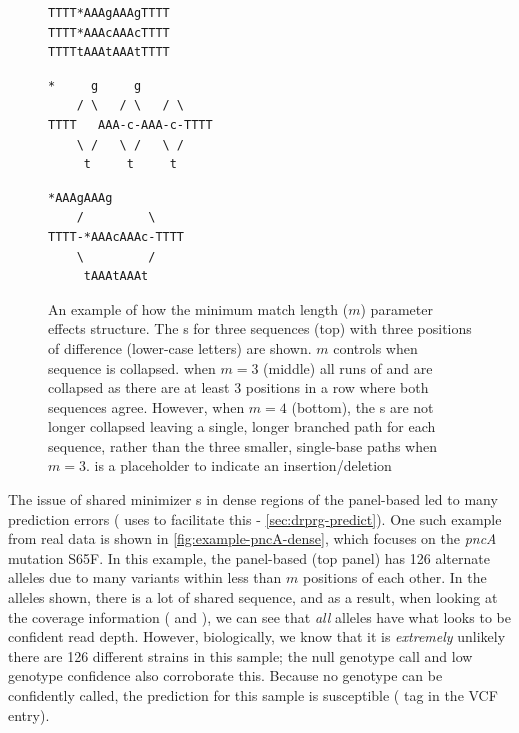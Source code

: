 \begin{figure}
\begin{Verbatim}[frame=single,framerule=0.5mm,label=Sequences,fontsize=\small,framesep=5mm]
TTTT*AAAgAAAgTTTT
TTTT*AAAcAAAcTTTT
TTTTtAAAtAAAtTTTT
\end{Verbatim}

\begin{Verbatim}[frame=single,framerule=0.5mm,label={$m=3$},fontsize=\small,framesep=5mm]
     *     g     g
    / \   / \   / \
TTTT   AAA-c-AAA-c-TTTT
    \ /   \ /   \ /
     t     t     t
\end{Verbatim}

\begin{Verbatim}[frame=single,framerule=0.5mm,label={$m=4$},fontsize=\small,framesep=5mm]
     *AAAgAAAg
    /         \
TTTT-*AAAcAAAc-TTTT
    \         /
     tAAAtAAAt
\end{Verbatim}
\caption{An example of how the \makeprg{} minimum match length ($m$) parameter effects \prg{} structure. The \prg{}s for three sequences (top) with three positions of difference (lower-case letters) are shown. $m$ controls when sequence is collapsed. when $m=3$ (middle) all runs of  and  are collapsed as there are at least 3 positions in a row where both sequences agree. However, when $m=4$ (bottom), the s are not longer collapsed leaving a single, longer branched path for each sequence, rather than the three smaller, single-base paths when $m=3$. \vrb{*} is a placeholder to indicate an insertion/deletion}
\label{fig:min-match-len-example}
\end{figure}

The issue of shared minimizer \kmer{}s in dense regions of the panel-based \prg{} led to many \drprg{} prediction errors (\drprg{} uses \pandora{} to facilitate this - \autoref{sec:drprg-predict}). One such example from real data is shown in \autoref{fig:example-pncA-dense}, which focuses on the \textit{pncA} mutation S65F. In this example, the panel-based \prg{} (top panel) has 126 alternate alleles due to many variants within less than $m$ positions of each other. In the alleles shown, there is a lot of shared sequence, and as a result, when looking at the coverage information ( and ), we can see that \emph{all} alleles have what looks to be confident read depth. However, biologically, we know that it is \emph{extremely} unlikely there are 126 different strains in this sample; the null genotype call and low genotype confidence also corroborate this. Because no genotype can be confidently called, the prediction for this sample is susceptible ( tag in the VCF entry).

